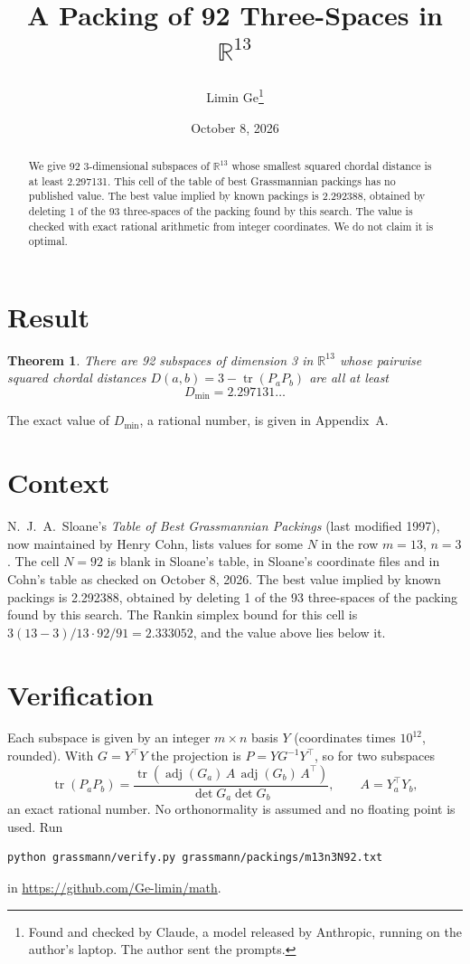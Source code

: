 \documentclass[11pt,a4paper]{article}
\title{A Packing of 92 Three-Spaces in $\mathbb{R}^{13}$}
\author{Limin Ge\thanks{Found and checked by Claude, a model released by Anthropic, running on the author's laptop. The author sent the prompts.}}
\date{October 8, 2026}
\newtheorem*{theorem}{Theorem}
\begin{document}
\maketitle
\begin{abstract}
We give 92 3-dimensional subspaces of $\mathbb{R}^{13}$ whose smallest squared chordal distance is at least 2.297131. This cell of the table of best Grassmannian packings has no published value. The best value implied by known packings is 2.292388, obtained by deleting 1 of the 93 three-spaces of the packing found by this search. The value is checked with exact rational arithmetic from integer coordinates. We do not claim it is optimal.
\end{abstract}

\section{Result}
\begin{theorem}
There are 92 subspaces of dimension 3 in $\mathbb{R}^{13}$ whose pairwise squared chordal distances $D(a,b) = 3 - \operatorname{tr}(P_aP_b)$ are all at least
\[ D_{\min} = 2.297131\ldots \]
\end{theorem}
The exact value of $D_{\min}$, a rational number, is given in Appendix~A.


\section{Context}
N.~J.~A.~Sloane's \emph{Table of Best Grassmannian Packings} (last modified 1997), now maintained by Henry Cohn, lists values for some $N$ in the row $m=13$, $n=3$. The cell $N=92$ is blank in Sloane's table, in Sloane's coordinate files and in Cohn's table as checked on October 8, 2026. The best value implied by known packings is 2.292388, obtained by deleting 1 of the 93 three-spaces of the packing found by this search. The Rankin simplex bound for this cell is $3(13-3)/13\cdot 92/91 = 2.333052$, and the value above lies below it.


\section{Verification}
Each subspace is given by an integer $m\times n$ basis $Y$ (coordinates times $10^{12}$, rounded). With $G=Y^\top Y$ the projection is $P=YG^{-1}Y^\top$, so for two subspaces
\[ \operatorname{tr}(P_aP_b)=\frac{\operatorname{tr}(\operatorname{adj}(G_a)\,A\,\operatorname{adj}(G_b)\,A^\top)}{\det G_a\det G_b},\qquad A=Y_a^\top Y_b, \]
an exact rational number. No orthonormality is assumed and no floating point is used. Run
\begin{verbatim}
python grassmann/verify.py grassmann/packings/m13n3N92.txt
\end{verbatim}
in \url{https://github.com/Ge-limin/math}.
\end{document}
